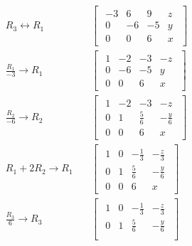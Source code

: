 \documentclass{zc-ust-hw}
\begin{document}
\begin{enumerate}
        \begin{align}
          R_3 \leftrightarrow R_1
          & \quad
          \begin{bmatrix} 
            \begin{array}{ccc|c}
              -3 & 6 & 9 & z \\
              0 & -6 & -5 & y \\
              0 & 0 & 6 & x
            \end{array}
          \end{bmatrix} \\
          \frac{ R_1 }{-3}\rightarrow R_1
          & \quad
          \begin{bmatrix} 
            \begin{array}{ccc|c}
              1 & -2 & -3 & -z \\
              0 & -6 & -5 & y \\
              0 & 0 & 6 & x
            \end{array}
          \end{bmatrix} \\
          \frac{ R_2 }{-6}\rightarrow R_2
          & \quad
          \begin{bmatrix} 
            \begin{array}{ccc|c}
              1 & -2 & -3 & -z \\
              0 & 1 & \frac{5}{6} & -\frac{y}{6} \\
              0 & 0 & 6 & x
            \end{array}
          \end{bmatrix} \\
          R_1+2R_2\rightarrow R_1
          & \quad
          \begin{bmatrix} 
            \begin{array}{ccc|c}
              1 & 0 & -\frac{1}{3} & -\frac{z}{3} \\
              0 & 1 & \frac{5}{6} & -\frac{y}{6} \\
              0 & 0 & 6 & x
            \end{array}
          \end{bmatrix} \\
          \frac{ R_3 }{6}\rightarrow R_3
          & \quad
          \begin{bmatrix} 
            \begin{array}{ccc|c}
              1 & 0 & -\frac{1}{3} & -\frac{z}{3} \\
              0 & 1 & \frac{5}{6} & -\frac{y}{6} \\

\end{array}
\end{bmatrix}
\end{align}
\end{enumerate}
\end{document}
